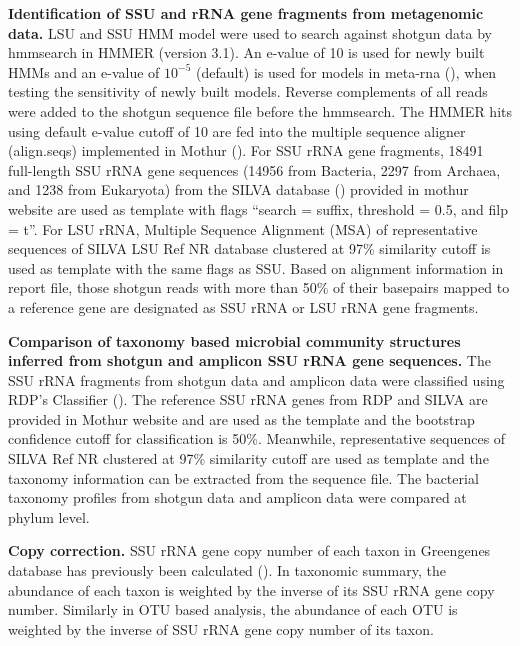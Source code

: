 \documentclass[12pt]{article}
\begin{document}
  {\bf Identification of SSU and rRNA gene fragments from metagenomic data. }
  LSU and SSU HMM model were used to search against shotgun data by hmmsearch in HMMER (version 3.1). An e-value of 10 is used for newly built HMMs and  an e-value of $10^{-5}$ (default) is used for models in meta-rna (\cite{metarna}), when testing the sensitivity of newly built models. Reverse complements of all reads were added to the shotgun sequence file before the hmmsearch. The HMMER hits using default e-value cutoff of 10 are fed into the multiple sequence aligner (align.seqs) implemented in Mothur (\cite{mothuraligner2009}). For SSU rRNA gene fragments, 18491 full-length SSU rRNA gene sequences (14956 from Bacteria, 2297 from Archaea, and 1238 from Eukaryota) from the SILVA database (\cite{silva2013}) provided in mothur website are used as template with flags ``search = suffix, threshold = 0.5, and filp = t''.  For LSU rRNA, Multiple Sequence Alignment (MSA) of representative sequences of SILVA LSU Ref NR database clustered at 97\% similarity cutoff is used as template with the same flags as SSU. Based on alignment information in report file, those shotgun reads with more than 50\% of their basepairs mapped to a reference gene are designated as SSU rRNA or LSU rRNA gene fragments.

  {\bf Comparison of taxonomy based microbial community structures inferred from shotgun and amplicon SSU rRNA gene sequences. }
The SSU rRNA fragments from shotgun data and amplicon data were classified using RDP’s Classifier (\cite{rdpclassifier}). The reference SSU rRNA genes from RDP and SILVA are provided in Mothur website and are used as the template and the bootstrap confidence cutoff for classification is 50\%. Meanwhile, representative sequences of SILVA Ref NR clustered at 97\% similarity cutoff are used as template and the taxonomy information can be extracted from the sequence file. The bacterial taxonomy profiles from shotgun data and amplicon data were compared at phylum level.

  {\bf Copy correction. }
  SSU rRNA gene copy number of each taxon in Greengenes database has previously been calculated (\cite{copyrighter}). In taxonomic summary, the abundance of each taxon is weighted by the inverse of its SSU rRNA gene copy number. Similarly in OTU based analysis, the abundance of each OTU is weighted by the inverse of SSU rRNA gene copy number of its taxon.
\end{document}
